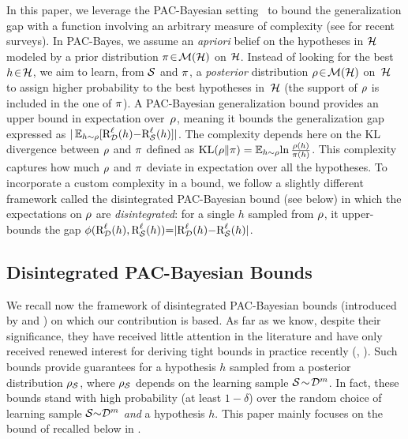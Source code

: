 \documentclass[twoside]{article}
\theoremstyle{plain}
\begin{document}
In this paper, we leverage the PAC-Bayesian setting~\citep{shawetaylor1997pac,mcallester1998some} to bound the generalization gap with a function involving an arbitrary measure of complexity (see \citet{guedj2019primer,hellstrom2023generalization,alquier2024user} for recent surveys).
In PAC-Bayes, we assume an \textit{apriori} belief on the hypotheses in $\Hcal$ modeled by a prior distribution $\P\!\in\!\Mcal(\Hcal)$ on $\Hcal$.
Instead of looking for the best $h\!\in\!\Hcal$, we aim to learn, from $\Scal$ and $\P$, a \textit{posterior} distribution $\Q\!\in\!\Mcal(\Hcal)$ \mbox{on $\Hcal$} to assign higher probability to the best hypotheses \mbox{in $\Hcal$} (the support of $\Q$ is included in the one of $\P$). 
A PAC-Bayesian generalization bound provides an upper bound in expectation \mbox{over $\Q$}, meaning it bounds the generalization gap expressed as $\vert\EE_{h\sim\Q}[\RiskLoss_{\Dcal}(h){-}\RiskLoss_{\Scal}(h)]\vert$. 
The complexity depends here on the KL divergence between $\Q$ and $\P$ defined as $\KL(\Q\|\P)=\EE_{h\sim\Q}\!\ln\frac{\Q(h)}{\P(h)}$.
This complexity captures how much $\Q$ and $\P$ deviate in expectation over all the hypotheses.
To incorporate a custom complexity in a bound, we follow a slightly different framework called the disintegrated PAC-Bayesian bound (see below) in which the expectations on $\Q$ are \textit{disintegrated}: for a single $h$ sampled from $\Q$, it upper-bounds the gap $\phi(\RiskLoss_{\Dcal}(h), \RiskLoss_{\Scal}(h)){=}\vert\RiskLoss_{\Dcal}(h){-}\RiskLoss_{\Scal}(h)\vert$.

\subsection{Disintegrated PAC-Bayesian Bounds}
\label{sec:disintegrated}

We recall now the framework of disintegrated PAC-Bayesian bounds (introduced by \citet[Th~1.2.7]{catoni2007pac} and \citet[Prop~3.1]{blanchard2007occams}) on which our contribution is based.
As far as we know, despite their significance, they have received little attention in the literature and have only received renewed interest for deriving tight bounds in practice recently (\eg, \citet{rivasplata2020pac,hellstrom2020generalization,viallard2024general}).
Such bounds provide guarantees for a hypothesis $h$ sampled from a posterior distribution $\AQ$, where $\AQ$ depends on the learning sample $\Scal\!\sim\! \Dcal^m$. 
In fact, these bounds stand with high probability (at least $1{-}\delta$) over the random choice of learning sample $\Scal{\sim} \Dcal^m$ \emph{and} a hypothesis $h$.
This paper mainly focuses on the bound of \citet[][Th.1~{\it (i)}]{rivasplata2020pac} recalled below in .
\end{document}
